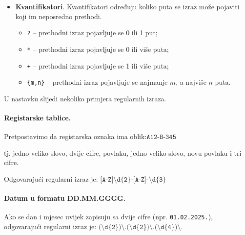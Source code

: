 \begin{itemize}
\begin{itemize}
		\item \texttt{\textbackslash t} -- odgovara tabulatoru;
		
		\item \texttt{\textbackslash b} -- odgovara granici riječi.
		
	\end{itemize}
	
	\item \textbf{Kvantifikatori}. Kvantifikatori određuju koliko puta se izraz  može pojaviti  koji im neposredno prethodi.
	
	\begin{itemize}
		
		\item \texttt{?} -- prethodni izraz pojavljuje se 0 ili 1 put;
		
		\item \texttt{*} -- prethodni izraz pojavljuje se 0 ili više puta;
		
		\item \texttt{+} -- prethodni izraz pojavljuje se 1 ili više puta;
		
		\item \texttt{\{m,n\}} -- prethodni izraz pojavljuje se najmanje $m$, a najviše $n$ puta.
		
	\end{itemize}
	
\end{itemize}

U nastavku slijedi nekoliko primjera regularnih izraza.
 

\paragraph{Registarske tablice.}

Pretpostavimo da registarska oznaka ima oblik:$
\texttt{A12-B-345}$

tj. jedno veliko slovo, dvije cifre, povlaku, jedno veliko slovo, novu povlaku i tri cifre.

Odgovarajući regularni izraz je: $
\texttt{[A-Z]\textbackslash d\{2\}-[A-Z]-\textbackslash d\{3\}}$

\paragraph{Datum u formatu DD.MM.GGGG.}

Ako se dan i mjesec uvijek zapisuju sa dvije cifre (npr. \texttt{01.02.2025.}), odgovarajući regularni izraz je: $
\texttt{(\textbackslash d\{2\})\textbackslash.(\textbackslash d\{2\})\textbackslash.(\textbackslash d\{4\})\textbackslash.} $

